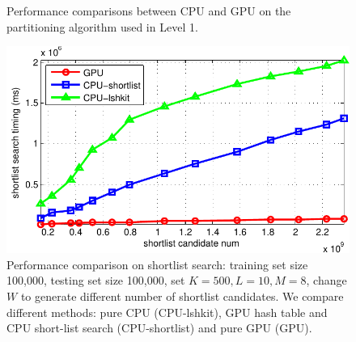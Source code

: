 \begin{figure}[t]
  \caption[Performance comparisons between CPU-based and GPU-based partitioning components in Bi-level LSH]{\label{fig:6:res:level1} Performance comparisons between CPU and GPU on the partitioning algorithm used in Level 1.}
\end{figure}


\begin{figure}[t]
  \centering
  \includegraphics[width=0.8\linewidth]{figs/6/res/shortlist.pdf}
  \caption[Performance comparison on shortlist search used in Bi-level LSH]{\label{fig:6:res:shortlist} Performance comparison on shortlist search: training set size 100,000, testing set size 100,000, set $K=500, L=10, M=8$, change $W$ to generate different number of shortlist candidates. We compare different methods: pure CPU (CPU-lshkit), GPU hash table and CPU short-list search (CPU-shortlist) and pure GPU (GPU).}
\end{figure}


